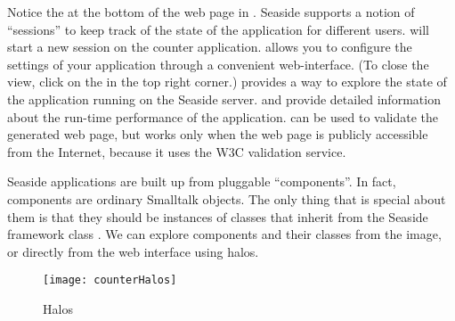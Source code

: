 \documentclass[a4paper,10pt,twoside]{book}
\begin{document}
Notice the  at the bottom of the web page in
.
Seaside supports a notion of ``sessions'' to keep track of the state of the application
for different users.
 will start a new session on the counter application.
 allows you to configure the settings of your application through a
convenient web-interface.
(To close the  view, click on the  in the top right corner.)
 provides a way to explore the state of the application running on
the Seaside server.
 and  provide detailed information about the run-time
performance of the application.
 can be used to validate the generated web page, but works only when the
web page is publicly accessible from the Internet, because it uses the W3C validation
service.

Seaside applications are built up from pluggable ``components''.
In fact, components are ordinary Smalltalk objects.
The only thing that is special about them is that they should be instances of classes
that inherit from the Seaside framework class .
We can explore components and their classes from the \pharo image, or directly from the
web interface using halos.

\begin{figure}[ht]
\begin{center}
\texttt{[image: counterHalos]}
\caption{Halos}
\end{center}
\end{figure}

\end{document}
